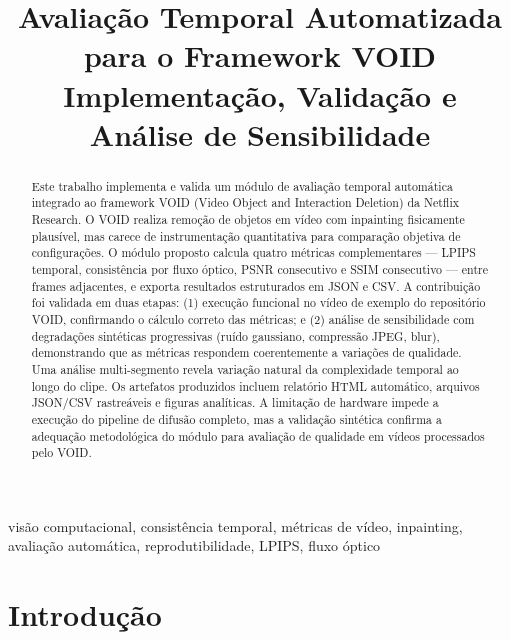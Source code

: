 \documentclass[conference]{IEEEtran}
\begin{document}
\title{Avaliação Temporal Automatizada para o Framework VOID\\
\large{Implementação, Validação e Análise de Sensibilidade}}

\author{
}

\maketitle

\begin{abstract}
Este trabalho implementa e valida um módulo de avaliação temporal automática integrado ao framework VOID (Video Object and Interaction Deletion) da Netflix Research. O VOID realiza remoção de objetos em vídeo com inpainting fisicamente plausível, mas carece de instrumentação quantitativa para comparação objetiva de configurações. O módulo proposto calcula quatro métricas complementares — LPIPS temporal, consistência por fluxo óptico, PSNR consecutivo e SSIM consecutivo — entre frames adjacentes, e exporta resultados estruturados em JSON e CSV. A contribuição foi validada em duas etapas: (1) execução funcional no vídeo de exemplo do repositório VOID, confirmando o cálculo correto das métricas; e (2) análise de sensibilidade com degradações sintéticas progressivas (ruído gaussiano, compressão JPEG, blur), demonstrando que as métricas respondem coerentemente a variações de qualidade. Uma análise multi-segmento revela variação natural da complexidade temporal ao longo do clipe. Os artefatos produzidos incluem relatório HTML automático, arquivos JSON/CSV rastreáveis e figuras analíticas. A limitação de hardware impede a execução do pipeline de difusão completo, mas a validação sintética confirma a adequação metodológica do módulo para avaliação de qualidade em vídeos processados pelo VOID.
\end{abstract}

\begin{IEEEkeywords}
visão computacional, consistência temporal, métricas de vídeo, inpainting, avaliação automática, reprodutibilidade, LPIPS, fluxo óptico
\end{IEEEkeywords}

\section{Introdução}
\end{document}
